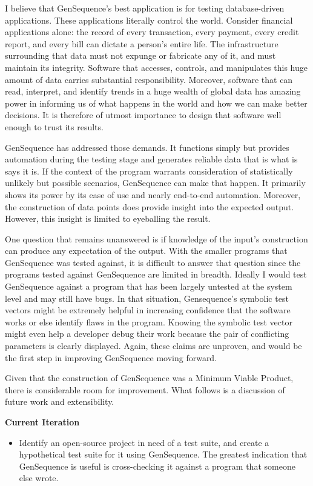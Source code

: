 
I believe that GenSequence's best application is for testing database-driven applications. These applications literally control the world. Consider financial applications alone: the record of every transaction, every payment, every credit report, and every bill can dictate a person's entire life. The infrastructure surrounding that data must not expunge or fabricate any of it, and must maintain its integrity. Software that accesses, controls, and manipulates this huge amount of data carries substantial responsibility. Moreover, software that can read, interpret, and identify trends in a huge wealth of global data has amazing power in informing us of what happens in the world and how we can make better decisions. It is therefore of utmost importance to design that software well enough to trust its results.

GenSequence has addressed those demands. It functions simply but provides automation during the testing stage and generates reliable data that is what is says it is. If the context of the program warrants consideration of statistically unlikely but possible scenarios, GenSequence can make that happen. It primarily shows its power by its ease of use and nearly end-to-end automation. Moreover, the construction of data points does provide insight into the expected output. However, this insight is limited to eyeballing the result.

One question that remains unanswered is if knowledge of the input's construction can produce any expectation of the output. With the smaller programs that GenSequence was tested against, it is difficult to answer that question since the programs tested against GenSequence are limited in breadth. Ideally I would test GenSequence against a program that has been largely untested at the system level and may still have bugs. In that situation, Gensequence's symbolic test vectors might be extremely helpful in increasing confidence that the software works or else identify flaws in the program. Knowing the symbolic test vector might even help a developer debug their work because the pair of conflicting parameters is clearly displayed. Again, these claims are unproven, and would be the first step in improving GenSequence moving forward.

Given that the construction of GenSequence was a Minimum Viable Product, there is considerable room for improvement. What follows is a discussion of future work and extensibility.

\vspace{1cm}
\textbf{Current Iteration}
\begin{itemize}
\item Identify an open-source project in need of a test suite, and create a hypothetical test suite for it using GenSequence. The greatest indication that GenSequence is useful is cross-checking it against a program that someone else wrote.
\end{itemize}

